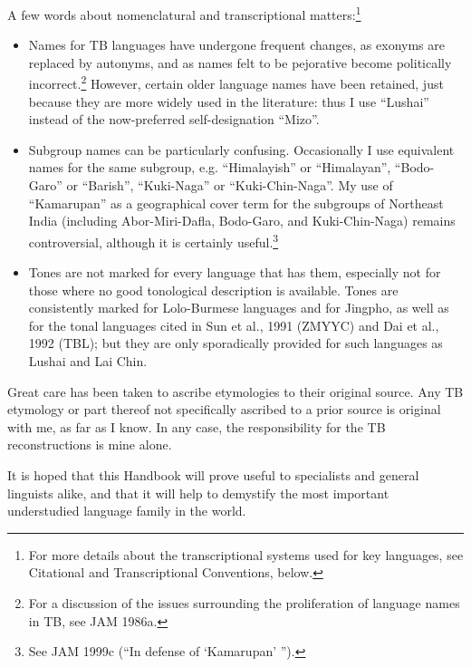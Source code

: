A few words about nomenclatural and transcriptional matters:\footnote{For more details about the transcriptional systems used for key languages, see Citational and Transcriptional Conventions, below.}
\begin{itemize}

\item Names for TB languages have undergone frequent changes, as exonyms are replaced by autonyms, and as names felt to be pejorative become politically incorrect.\footnote{For a discussion of the issues surrounding the proliferation of language names in TB, see JAM 1986a.} However, certain older language names have been retained, just because they are more widely used in the literature: thus I use ``Lushai'' instead of the now-preferred self-designation ``Mizo''.
\item Subgroup names can be particularly confusing. Occasionally I use equivalent names for the same subgroup, e.g. ``Himalayish'' or ``Himalayan'', ``Bodo-Garo'' or ``Barish'', ``Kuki-Naga'' or ``Kuki-Chin-Naga''. My use of ``Kamarupan'' as a geographical cover term for the subgroups of Northeast India (including Abor-Miri-Dafla, Bodo-Garo, and Kuki-Chin-Naga) remains controversial, although it is certainly useful.\footnote{See JAM 1999c (``In defense of `Kamarupan' '').}
\item Tones are not marked for every language that has them, especially not for those where no good tonological description is available. Tones are consistently marked for Lolo-Burmese languages and for Jingpho, as well as for the tonal languages cited in Sun et al., 1991 (ZMYYC) and Dai et al., 1992 (TBL); but they are only sporadically provided for such languages as Lushai and Lai Chin.
\end{itemize}

Great care has been taken to ascribe etymologies to their original source. Any TB etymology or part thereof not specifically ascribed to a prior source is original with me, as far as I know. In any case, the responsibility for the TB reconstructions is mine alone.

It is hoped that this Handbook will prove useful to specialists and general linguists alike, and that it will help to demystify the most important understudied language family in the world.